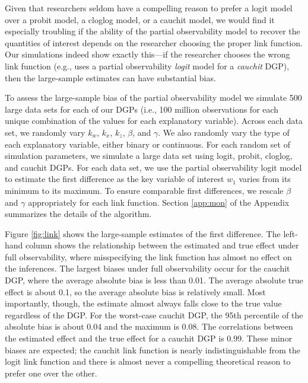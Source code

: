 \documentclass[10pt]{article}
\begin{document}
Given that researchers seldom have a compelling reason to prefer a logit model over a probit model, a cloglog model, or a cauchit model, we would find it especially troubling if the ability of the partial observability model to recover the quantities of interest depends on the researcher choosing the proper link function. 
Our simulations indeed show exactly this---if the researcher chooses the wrong link function (e.g., uses a partial observability \textit{logit} model for a \textit{cauchit} DGP), then the large-sample estimates can have substantial bias.

To assess the large-sample bias of the partial observability model we simulate 500 large data sets for each of our DGPs (i.e., 100 million observations for each unique combination of the values for each explanatory variable). 
Across each data set, we randomly vary $k_w$, $k_x$, $k_z$, $\beta$, and $\gamma$. 
We also randomly vary the type of each explanatory variable, either binary or continuous. 
For each random set of simulation parameters, we simulate a large data set using logit, probit, cloglog, and cauchit DGPs.  
For each data set, we use the partial observability logit model to estimate the first difference as the key variable of interest $w_1$ varies from its minimum to its maximum. 
To ensure comparable first differences, we rescale $\beta$ and $\gamma$ appropriately for each link function. Section \ref{app:mon} of the Appendix summarizes the details of the algorithm.

Figure \ref{fig:link} shows the large-sample estimates of the first difference. 
The left-hand column shows the relationship between the estimated and true effect under full observability, where misspecifying the link function has almost no effect on the inferences. 
The largest biases under full observability occur for the cauchit DGP, where the average absolute bias is less than 0.01. 
The average absolute true effect is about 0.1, so the average absolute bias is relatively small. 
Most importantly, though, the estimate almost always falls close to the true value regardless of the DGP. 
For the worst-case cauchit DGP, the 95th percentile of the absolute bias is about 0.04 and the maximum is 0.08. 
The correlations between the estimated effect and the true effect for a cauchit DGP is 0.99.
These minor biases are expected; the cauchit link function is nearly indistinguishable from the logit link function and there is almost never a compelling theoretical reason to prefer one over the other. 
\end{document}
